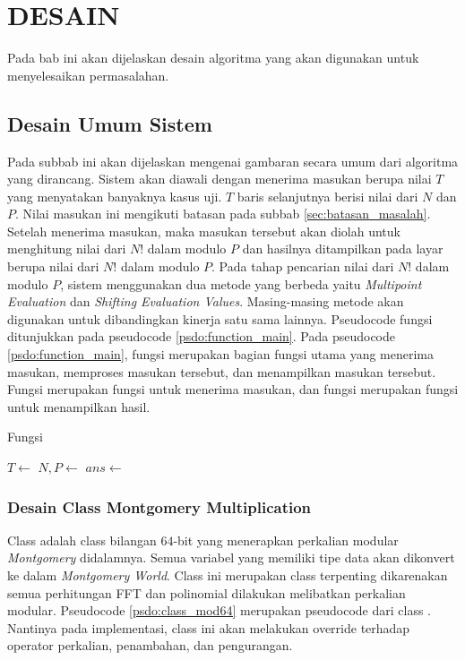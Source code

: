 \chapter{DESAIN}
\label{sec:desain}
Pada bab ini akan dijelaskan desain algoritma yang akan digunakan untuk menyelesaikan permasalahan.

\section{Desain Umum Sistem}
Pada subbab ini akan dijelaskan mengenai gambaran secara umum dari algoritma yang dirancang. Sistem akan diawali dengan menerima masukan berupa nilai $ T $ yang menyatakan banyaknya kasus uji. $ T $ baris selanjutnya berisi nilai dari $ N $ dan $ P $. Nilai masukan ini mengikuti batasan pada subbab \ref{sec:batasan_masalah}. Setelah menerima masukan, maka masukan tersebut akan diolah untuk menghitung nilai dari $ N! $ dalam modulo $ P $ dan hasilnya ditampilkan pada layar berupa nilai dari $ N! $ dalam modulo $ P $. Pada tahap pencarian nilai dari  $ N! $ dalam modulo $ P $, sistem menggunakan dua metode yang berbeda yaitu \textit{Multipoint Evaluation} dan \textit{Shifting Evaluation Values}. Masing-masing metode akan digunakan untuk dibandingkan kinerja satu sama lainnya. Pseudocode fungsi  ditunjukkan pada pseudocode \ref{psdo:function_main}. Pada pseudocode \ref{psdo:function_main}, fungsi  merupakan bagian fungsi utama yang menerima masukan, memproses masukan tersebut, dan menampilkan masukan tersebut. Fungsi  merupakan fungsi untuk menerima masukan, dan fungsi  merupakan fungsi untuk menampilkan hasil. 

\begin{algorithm}
	\caption{Fungsi }
	\label{psdo:function_main}
	\begin{algorithmic}[1]
		\State $T \leftarrow $ 
			\State $ N , P \leftarrow $ 
			\State $ ans \leftarrow  $ 
			\State {}
		\EndFor
	\end{algorithmic}
\end{algorithm}

\subsection{Desain Class Montgomery Multiplication}
\label{sec:mont}
Class  adalah class bilangan $64$-bit yang menerapkan perkalian modular \textit{Montgomery} didalamnya. Semua variabel yang memiliki tipe data  akan dikonvert ke dalam \textit{Montgomery World}. Class ini merupakan class terpenting dikarenakan semua perhitungan FFT dan polinomial dilakukan melibatkan perkalian modular. Pseudocode \ref{psdo:class_mod64} merupakan pseudocode dari class . Nantinya pada implementasi, class ini akan melakukan override terhadap operator perkalian, penambahan, dan pengurangan.


